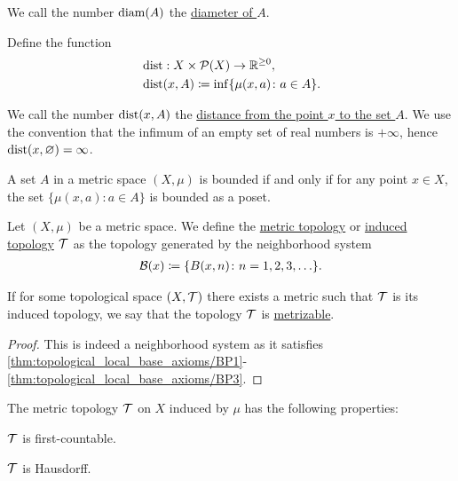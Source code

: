 \begin{definition}
\begin{defenum}
    We call the number $\operatorname{diam}(A)$ the \ul{diameter of $A$}.

    \item\label{def:metric_space/distance} Define the function
    \begin{align*}
      &\operatorname{dist}: X \times \operatorname{\mathcal P}(X) \to \mathbb R^{\geq 0}, \\
      &\operatorname{dist}(x, A) \coloneqq \inf \{ \mu(x, a) \colon a \in A \}.
    \end{align*}

    We call the number $\operatorname{dist}(x, A)$ the \ul{distance from the point $x$ to the set $A$}. We use the convention that the infimum of an empty set of real numbers is $+\infty$, hence $\operatorname{dist}(x, \varnothing) = \infty$.
  \end{defenum}
\end{definition}

\begin{note}\label{note:bounded_set_metric_order_equivalence}
  A set $A$ in a metric space $(X, \mu)$ is bounded if and only if for any point $x \in X$, the set $\{ \mu(x, a) \colon a \in A \}$ is bounded as a poset.
\end{note}

\begin{definition}\label{def:metric_topology}\cite[249]{Engelking1989}
  Let $(X, \mu)$ be a metric space. We define the \ul{metric topology} or \ul{induced topology} $\mathcal T$ as the topology generated by the neighborhood system
  \begin{align*}
    \mathcal B(x) \coloneqq \{ B(x, n) \colon n = 1, 2, 3, \ldots \}.
  \end{align*}

  If for some topological space $(X, \mathcal T)$ there exists a metric such that $\mathcal T$ is its induced topology, we say that the topology $\mathcal T$ is \ul{metrizable}.
\end{definition}
\begin{proof}
  This is indeed a neighborhood system as it satisfies \ref{thm:topological_local_base_axioms/BP1}-\ref{thm:topological_local_base_axioms/BP3}.
\end{proof}

\begin{proposition}\label{thm:metric_topology_properties}
  The metric topology $\mathcal T$ on $X$ induced by $\mu$ has the following properties:
  \begin{defenum}
    \item\label{thm:metric_topology_properties/first_countable} $\mathcal T$ is first-countable.
    \item\label{thm:metric_topology_properties/hausdorff} $\mathcal T$ is Hausdorff.
  \end{defenum}
\end{proposition}
